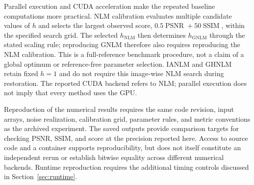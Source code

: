 \documentclass[pdflatex,iicol,sn-mathphys-num]{sn-jnl}
\newif\ifshowportuguese
\newcommand{\pt}[1]{\ifshowportuguese\par\begingroup\small\color{blue!55!black}\noindent\textbf{PT: }#1\par\endgroup\fi}
\begin{document}
Parallel execution and CUDA acceleration make the repeated baseline computations more practical. NLM calibration evaluates multiple candidate values of $h$ and selects the largest observed score, $0.5\operatorname{PSNR}+50\operatorname{SSIM}$, within the specified search grid. The selected $h_{\mathrm{NLM}}$ then determines $h_{\mathrm{GNLM}}$ through the stated scaling rule; reproducing GNLM therefore also requires reproducing the NLM calibration. This is a full-reference benchmark procedure, not a claim of a global optimum or reference-free parameter selection. IANLM and GHNLM retain fixed $h=1$ and do not require this image-wise NLM search during restoration. The reported CUDA backend refers to NLM; parallel execution does not imply that every method uses the GPU.
\pt{A execução paralela e a aceleração CUDA tornam mais práticas as computações repetidas dos baselines. A calibração NLM avalia múltiplos valores candidatos de $h$ e seleciona o maior score observado, $0.5\operatorname{PSNR}+50\operatorname{SSIM}$, dentro da grade de busca especificada. O $h_{\mathrm{NLM}}$ selecionado determina então $h_{\mathrm{GNLM}}$ pela regra de escala apresentada; reproduzir o GNLM, portanto, também exige reproduzir a calibração NLM. Esse é um procedimento de benchmark com referência completa, não uma afirmação de ótimo global ou seleção de parâmetros sem referência. IANLM e GHNLM mantêm $h=1$ fixo e não exigem essa busca NLM por imagem durante a restauração. O backend CUDA informado refere-se ao NLM; execução paralela não implica que todos os métodos usem a GPU.}

Reproduction of the numerical results requires the same code revision, input arrays, noise realization, calibration grid, parameter rules, and metric conventions as the archived experiment. The saved outputs provide comparison targets for checking PSNR, SSIM, and score at the precision reported here. Access to source code and a container supports reproducibility, but does not itself constitute an independent rerun or establish bitwise equality across different numerical backends. Runtime reproduction requires the additional timing controls discussed in Section~\ref{sec:runtime}.
\pt{A reprodução dos resultados numéricos exige a mesma revisão do código, arrays de entrada, realização do ruído, grade de calibração, regras de parâmetros e convenções de métricas do experimento arquivado. As saídas salvas fornecem alvos de comparação para conferir PSNR, SSIM e score na precisão apresentada aqui. O acesso ao código-fonte e a um contêiner favorece a reprodutibilidade, mas não constitui, por si só, uma reexecução independente nem estabelece igualdade bit a bit entre diferentes backends numéricos. A reprodução dos tempos exige os controles adicionais discutidos na Seção~\ref{sec:runtime}.}
\end{document}
